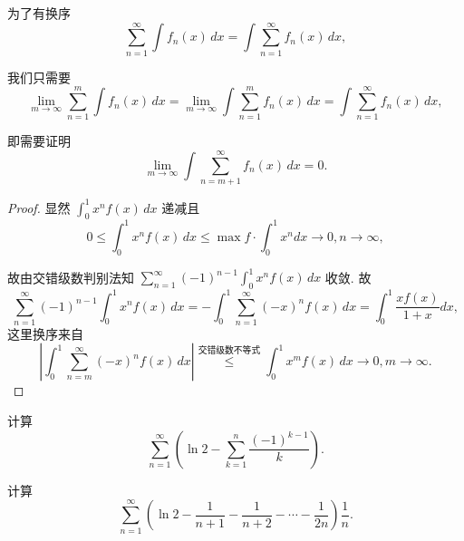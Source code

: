 \documentclass[lang=cn,10pt,thmcnt=section]{elegantbook}
\begin{document}
\begin{remark}
	为了有换序
\[
\sum_{n=1}^\infty \int f_n(x) \, dx = \int \sum_{n=1}^\infty f_n(x) \, dx,
\]

\noindent
我们只需要
\[
\lim_{m\to\infty} \sum_{n=1}^m \int f_n(x) \, dx = \lim_{m\to\infty} \int \sum_{n=1}^m f_n(x) \, dx = \int \sum_{n=1}^\infty f_n(x) \, dx,
\]

\noindent
即需要证明
\[
\lim_{m\to\infty} \int \sum_{n=m+1}^\infty f_n(x) \, dx = 0.
\]

\end{remark}
\begin{proof}
	显然 $\displaystyle\int_0^1 x^n f(x) \, dx$ 递减且
\[
0 \le \int_0^1 x^n f(x) \, dx \le \max f \cdot \int_0^1 x^n dx \to 0, n \to \infty,
\]

\noindent
故由交错级数判别法知 $\displaystyle\sum_{n=1}^\infty (-1)^{n-1} \int_0^1 x^n f(x) \, dx$ 收敛. 故
\[
\sum_{n=1}^\infty (-1)^{n-1} \int_0^1 x^n f(x) \, dx = -\int_0^1 \sum_{n=1}^\infty (-x)^n f(x) \, dx = \int_0^1 \frac{xf(x)}{1+x} dx,
\]
这里换序来自
\[
\left| \int_0^1 \sum_{n=m}^\infty (-x)^n f(x) \, dx \right| \stackrel{\text{交错级数不等式}}{\le} \int_0^1 x^m f(x) \, dx \to 0, m \to \infty.
\]
\end{proof}
\begin{example}
	计算
\[
\sum_{n=1}^{\infty} \left( \ln 2 - \sum_{k=1}^n \frac{(-1)^{k-1}}{k} \right).
\]
\end{example}
\begin{example}
	计算
\[
\sum_{n=1}^{\infty} \left( \ln 2 - \frac{1}{n+1} - \frac{1}{n+2} - \cdots - \frac{1}{2n} \right)\frac{1}{n}.
\]          
\end{example}
\end{document}
